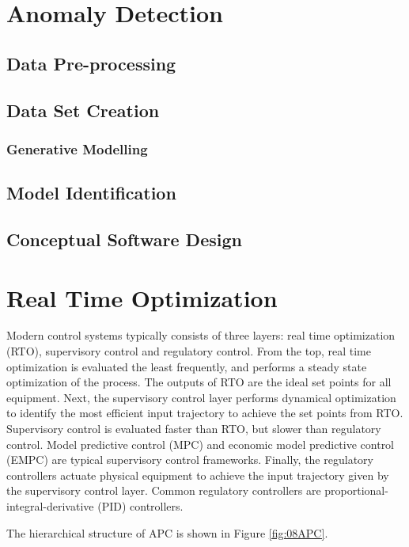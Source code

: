 \section{Anomaly Detection}
\subsection{Data Pre-processing}
\subsection{Data Set Creation}
\subsubsection{Generative Modelling}
\subsection{Model Identification}
\subsection{Conceptual Software Design}

\section{Real Time Optimization}
Modern control systems typically consists of three layers: real time optimization (RTO), supervisory control and regulatory control.  From the top, real time optimization is evaluated the least frequently, and performs a steady state optimization of the process.  The outputs of RTO are the ideal set points for all equipment.  Next, the supervisory control layer performs dynamical optimization to identify the most efficient input trajectory to achieve the set points from RTO. Supervisory control is evaluated faster than RTO, but slower than regulatory control. Model predictive control (MPC) and economic model predictive control (EMPC) are typical supervisory control frameworks. Finally, the regulatory controllers actuate physical equipment to achieve the input trajectory given by the supervisory control layer.  Common regulatory controllers are proportional-integral-derivative (PID) controllers.

The hierarchical structure of APC is shown in Figure \ref{fig:08APC}.

